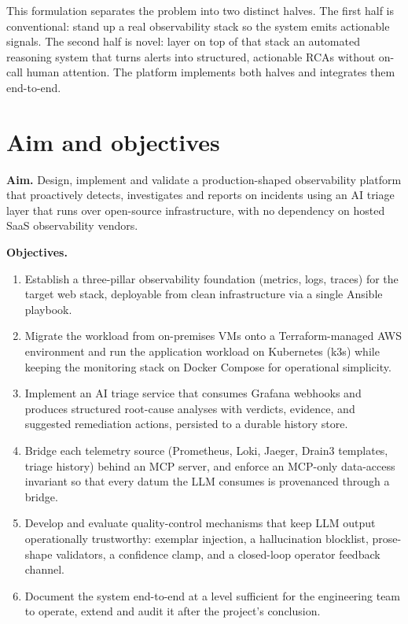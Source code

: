 \documentclass[11pt,a4paper,oneside]{report}
\begin{document}
This formulation separates the problem into two distinct halves.  The
first half is conventional: stand up a real observability stack so the
system emits actionable signals.  The second half is novel: layer on
top of that stack an automated reasoning system that turns alerts into
structured, actionable RCAs without on-call human attention.  The
platform implements both halves and integrates them end-to-end.

\section{Aim and objectives}

\textbf{Aim.}  Design, implement and validate a production-shaped
observability platform that proactively detects, investigates and
reports on incidents using an AI triage layer that runs over open-source
infrastructure, with no dependency on hosted SaaS observability
vendors.

\textbf{Objectives.}
\begin{enumerate}
  \item Establish a three-pillar observability foundation (metrics,
        logs, traces) for the target web stack, deployable from clean
        infrastructure via a single Ansible playbook.
  \item Migrate the workload from on-premises VMs onto a
        Terraform-managed AWS environment and run the application
        workload on Kubernetes (k3s) while keeping the monitoring stack
        on Docker Compose for operational simplicity.
  \item Implement an AI triage service that consumes Grafana webhooks
        and produces structured root-cause analyses with verdicts,
        evidence, and suggested remediation actions, persisted to a
        durable history store.
  \item Bridge each telemetry source (Prometheus, Loki, Jaeger,
        Drain3 templates, triage history) behind an MCP server, and
        enforce an MCP-only data-access invariant so that every datum
        the LLM consumes is provenanced through a bridge.
  \item Develop and evaluate quality-control mechanisms that keep
        LLM output operationally trustworthy: exemplar injection, a
        hallucination blocklist, prose-shape validators, a confidence
        clamp, and a closed-loop operator feedback channel.
  \item Document the system end-to-end at a level sufficient for the
        engineering team to operate, extend and audit it after the
        project's conclusion.
\end{enumerate}
\end{document}

